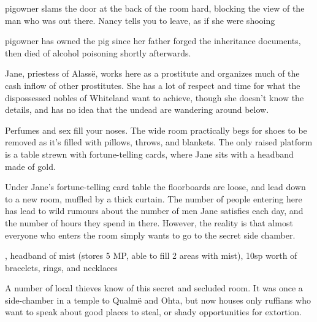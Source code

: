 \begin{multicols}{2}
\begin{boxtext}

	\Gls{pigowner} slams the door at the back of the room hard, blocking the view of the man who was out there.  Nancy tells you to leave, as if she were shooing 

\end{boxtext}

\pigowner

\Gls{pigowner} has owned the pig since her father forged the inheritance documents, then died of alcohol poisoning shortly afterwards.

\label{priestessjane}

Jane, priestess of Alass\"{e}, works here as a prostitute and organizes much of the cash inflow of other prostitutes.  She has a lot of respect and time for what the dispossessed nobles of Whiteland want to achieve, though she doesn't know the details, and has no idea that the undead are wandering around below.

\begin{boxtext}

	Perfumes and sex fill your noses.  The wide room practically begs for shoes to be removed as it's filled with pillows, throws, and blankets.  The only raised platform is a table strewn with fortune-telling cards, where Jane sits with a headband made of gold.

\end{boxtext}

Under Jane's fortune-telling card table the floorboards are loose, and lead down to a new room, muffled by a thick curtain.
The number of people entering here has lead to wild rumours about the number of men Jane satisfies each day, and the number of hours they spend in there.
However, the reality is that almost everyone who enters the room simply wants to go to the secret side chamber.


%
{\Dagger, headband of mist (stores 5 MP, able to fill 2 areas with mist), 10sp worth of bracelets, rings, and necklaces}%
{}


A number of local thieves know of this secret and secluded room.  It was once a side-chamber in a temple to Qualm\"{e} and Ohta, but now houses only ruffians who want to speak about good places to steal, or shady opportunities for extortion.


\end{multicols}
